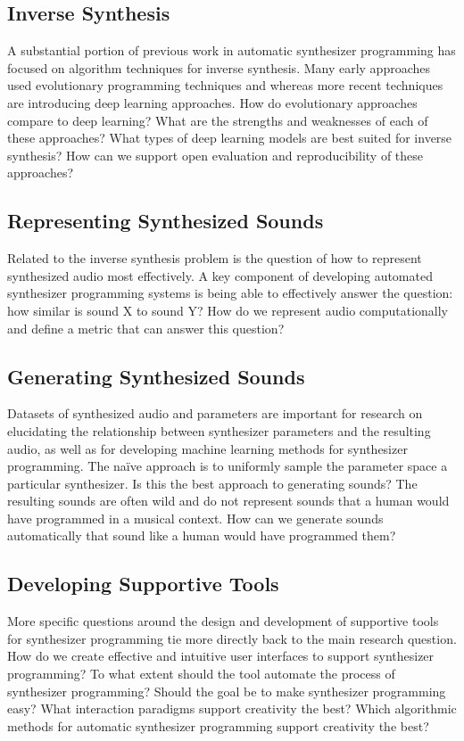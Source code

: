 \subsection{Inverse Synthesis}
A substantial portion of previous work in automatic synthesizer programming has focused on algorithm techniques for inverse synthesis. Many early approaches used evolutionary programming techniques and whereas more recent techniques are introducing deep learning approaches. How do evolutionary approaches compare to deep learning? What are the strengths and weaknesses of each of these approaches? What types of deep learning models are best suited for inverse synthesis? How can we support open evaluation and reproducibility of these approaches?

\subsection{Representing Synthesized Sounds}
Related to the inverse synthesis problem is the question of how to represent synthesized audio most effectively. A key component of developing automated synthesizer programming systems is being able to effectively answer the question: how similar is sound X to sound Y? How do we represent audio computationally and define a metric that can answer this question?

\subsection{Generating Synthesized Sounds}
Datasets of synthesized audio and parameters are important for research on elucidating the relationship between synthesizer parameters and the resulting audio, as well as for developing machine learning methods for synthesizer programming. The naïve approach is to uniformly sample the parameter space a particular synthesizer. Is this the best approach to generating sounds? The resulting sounds are often wild and do not represent sounds that a human would have programmed in a musical context. How can we generate sounds automatically that sound like a human would have programmed them?

\subsection{Developing Supportive Tools}
More specific questions around the design and development of supportive tools for synthesizer programming tie more directly back to the main research question. How do we create effective and intuitive user interfaces to support synthesizer programming? To what extent should the tool automate the process of synthesizer programming? Should the goal be to make synthesizer programming easy? What interaction paradigms support creativity the best? Which algorithmic methods for automatic synthesizer programming support creativity the best?


